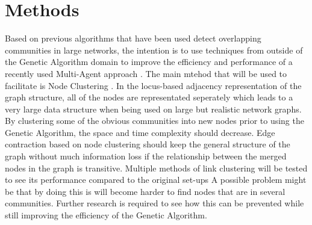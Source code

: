 \documentclass[twoside,twocolumn]{article}
\begin{document}

\section{Methods}
Based on previous algorithms that have been used detect overlapping communities in large networks, the intention is to use techniques from outside of the Genetic Algorithm domain to improve the efficiency and performance of a recently used Multi-Agent approach \cite{multiagent2016}.
The main mtehod that will be used to facilitate is Node Clustering \cite{Ding2016}.
In the locus-based adjacency representation of the graph structure, all of the nodes are representated seperately which leads to a very large data structure when being used on large but realistic network graphs.
By clustering some of the obvious communities into new nodes prior to using the Genetic Algorithm, the space and time complexity should decrease.
Edge contraction based on node clustering should keep the general structure of the graph without much information loss if the relationship between the merged nodes in the graph is transitive.
Multiple methods of link clustering will be tested to see its performance compared to the original set-ups
A possible problem might be that by doing this is will become harder to find nodes that are in several communities.
Further research is required to see how this can be prevented while still improving the efficiency of the Genetic Algorithm.





\end{document}
